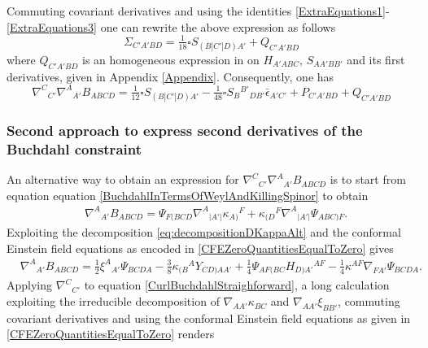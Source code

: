 \documentclass[10pt,a4paper]{article}
\theoremstyle{plain}
\begin{document}
Commuting covariant derivatives and using the identities
\eqref{ExtraEquations1}-\eqref{ExtraEquations3} one can rewrite
the above expression as
follows
\begin{equation}
\Sigma_{C'A'BD} = \tfrac{1}{18}\square S_{(B|C'|D)A'} +
Q_{C'A'BD}
\end{equation}
where $Q_{C'A'BD}$ is an homogeneous expression in on $H_{A'ABC}$,
$S_{AA'BB'}$ and its first derivatives, given in Appendix
\ref{Appendix}. Consequently, one has
\begin{equation} \label{SecondDerivativesOfBuchdahlToEquate1}
\nabla^{C}{}_{C'}\nabla^{A}{}_{A'}B_{ABCD}=\tfrac{1}{12}\square
S_{(B|C'|D)A'} -\tfrac{1}{48}\square
S_{B}{}^{B'}{}_{DB'}\bar{\epsilon}_{A'C'} + P_{C'A'BD}+Q_{C'A'BD}
\end{equation}


\subsubsection{Second approach to express second derivatives of the Buchdahl constraint}

An alternative way to obtain an expression for
$\nabla^{C}{}_{C'}\nabla^{A}{}_{A'}B_{ABCD}$ is to start from equation
equation \eqref{BuchdahlInTermsOfWeylAndKillingSpinor} to obtain
\begin{align*}
& \nabla^{A}{}_{A'}B_{ABCD} = \Psi_{F(BCD} \nabla^{A}{}_{\vert
    A'\vert}\kappa_{A)}{}^{F} + \kappa_{(D}{}^{F} \nabla^{A}{}_{\vert
    A'\vert}\Psi_{ABC)F} .
\end{align*}
Exploiting the decomposition \eqref{eq:decompositionDKappaAlt} and the
conformal Einstein field equations as encoded in
\eqref{CFEZeroQuantitiesEqualToZero} gives
\begin{align}\label{CurlBuchdahlStraighforward}
&\nabla^{A}{}_{A'}B_{ABCD} = \tfrac{1}{2} \xi^{A}{}_{A'} \Psi_{BCDA} -
  \tfrac{3}{8} \kappa_{(B}{}^{A} Y_{CD)AA'} + \tfrac{1}{4}
  \Psi_{AF(BC} H_{D)A'}{}^{AF} - \tfrac{1}{4} \kappa^{AF}
  \nabla_{FA'}\Psi_{BCDA}.
\end{align} 
Applying $\nabla^{C}{}_{C'}$ to equation
\eqref{CurlBuchdahlStraighforward}, a long calculation exploiting the
irreducible decomposition of $\nabla_{AA'}\kappa_{BC}$ and
$\nabla_{AA'}\xi_{BB'}$,
 commuting covariant derivatives and using the  conformal Einstein field equations as given in  \eqref{CFEZeroQuantitiesEqualToZero} renders
\end{document}

